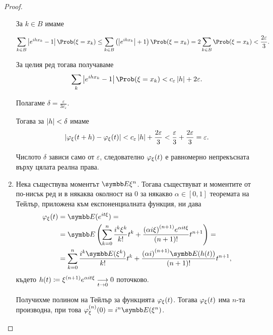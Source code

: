 \documentclass[numbers=endperiod, bibliography=totocnumbered]{scrartcl}
\begin{document}
\begin{proof}
\begin{enumerate}
    За \( k \in B \) имаме

    \begin{equation*}
      \sum_{k \in B} \Abs{e^{ih x_k} - 1} \Prob(\xi = x_k)
      \leq
      \sum_{k \in B} \left( \Abs{e^{ih x_k}} + 1 \right) \Prob(\xi = x_k)
      =
      2 \sum_{k \in B} \Prob(\xi = x_k)
      <
      \frac {2\varepsilon} 3.
    \end{equation*}

    За целия ред тогава получаваме
    \begin{equation*}
      \sum_k \Abs{e^{ih x_k} - 1} \Prob(\xi = x_k)
      <
      c_\varepsilon \Abs{h} + 2 \varepsilon.
    \end{equation*}

    Полагаме \( \delta = \frac \varepsilon {3 c_\varepsilon} \).

    Тогава за \( \Abs h < \delta \) имаме
    \begin{equation*}
      \Abs{\Char_\xi(t + h) - \Char_\xi(t)}
      <
      c_\varepsilon \Abs{h} + \frac {2\varepsilon} 3
      <
      \frac {\varepsilon} 3 + \frac {2\varepsilon} 3
      =
      \varepsilon.
    \end{equation*}

    Числото \( \delta \) зависи само от \( \varepsilon \), следователно \( \Char_\xi(t) \) е равномерно непрекъсната върху цялата реална права.

    \item Нека съществува моментът \( \Expect \xi^n \). Тогава съществуват и моментите от по-нисък ред и в някаква околност на \( 0 \) за някакво \( \alpha \in [0, 1] \) теоремата на Тейлър, приложена към експоненциалната функция, ни дава
    \begin{align*}
      \Char_\xi(t)
      &=
      \Expect(e^{it\xi})
      = \\ &=
      \Expect\left(\sum_{k=0}^n \frac {i^k \xi^k} {k!} t^k + \frac {{(\alpha i \xi)}^{(n+1)} e^{\alpha it \xi}} {(n+1)!} t^{n+1} \right)
      = \\ &=
      \sum_{k=0}^n \frac {i^k \Expect(\xi^k)} {k!} t^k + \frac {{(\alpha i)}^{(n+1)} \Expect(h(t))} {(n+1)!} t^{n+1},
    \end{align*}
    където \( h(t) \coloneqq \xi^{(n+1)} e^{\alpha it \xi} \Conv[t \to 0]{} 0 \) поточково.

    Получихме полином на Тейлър за функцията \( \Char_\xi(t) \). Тогава \( \Char_\xi(t) \) има \( n \)-та производна, при това \( \Char^{(n)}_\xi(0) = i^n \Expect(\xi^n) \).


\end{enumerate}
\end{proof}
\end{document}
